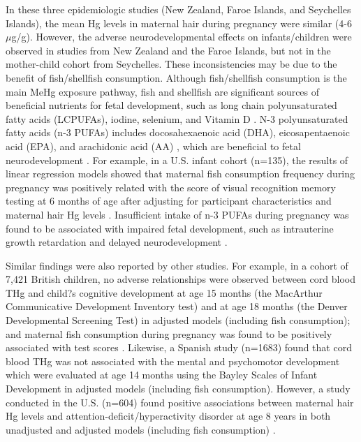 In these three epidemiologic studies (New Zealand, Faroe Islands, and Seychelles Islands), the mean Hg levels in maternal hair during pregnancy were similar (4-6 \({\mu}\)g/g). However, the adverse neurodevelopmental effects on infants/children were observed in studies from New Zealand and the Faroe Islands, but not in the mother-child cohort from Seychelles. These inconsistencies may be due to the benefit of fish/shellfish consumption. Although fish/shellfish consumption is the main MeHg exposure pathway, fish and shellfish are significant sources of beneficial nutrients for fetal development, such as long chain polyunsaturated fatty acids (LCPUFAs), iodine, selenium, and Vitamin D \cite{national2000toxicological}. N-3 polyunsaturated fatty acids (n-3 PUFAs) includes docosahexaenoic acid (DHA), eicosapentaenoic acid (EPA), and arachidonic acid (AA) \cite{siriwardhana2012health}, which are beneficial to fetal neurodevelopment \cite{birch2007visual}. For example, in a U.S. infant cohort (n=135), the results of linear regression models showed that maternal fish consumption frequency during pregnancy was positively related with the score of visual recognition memory testing at 6 months of age after adjusting for participant characteristics and maternal hair Hg levels \cite{oken2005maternal}. Insufficient intake of n-3 PUFAs during pregnancy was found to be associated with impaired fetal development, such as intrauterine growth retardation and delayed neurodevelopment \cite{hibbeln2007maternal}.

Similar findings were also reported by other studies. For example, in a cohort of 7,421 British children, no adverse relationships were observed between cord blood THg and child?s cognitive development at age 15 months (the MacArthur Communicative Development Inventory test) and at age 18 months (the Denver Developmental Screening Test) in adjusted models (including fish consumption); and maternal fish consumption during pregnancy was found to be positively associated with test scores \cite{daniels2004fish}. Likewise, a Spanish study (n=1683) found that cord blood THg was not associated with the mental and psychomotor development which were evaluated at age 14 months using the Bayley Scales of Infant Development \cite{llop2012prenatal} in adjusted models (including fish consumption). However, a study conducted in the U.S. (n=604) found positive associations between maternal hair Hg levels and attention-deficit/hyperactivity disorder at age 8 years in both unadjusted and adjusted models (including fish consumption) \cite{sagiv2012prenatal}.

